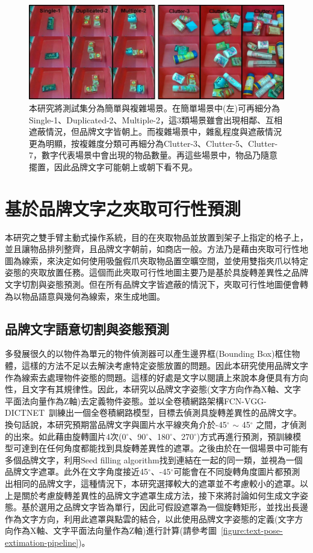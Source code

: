 \begin{figure}[htb]
	\centering
	\includegraphics[height=!, width=1.0\linewidth, keepaspectratio=true]
	{./figures/testset.jpg}
  \caption{本研究將測試集分為簡單與複雜場景。在簡單場景中(左)可再細分為Single-1、Duplicated-2、Multiple-2，這3類場景雖會出現相鄰、互相遮蔽情況，但品牌文字皆朝上。而複雜場景中，雜亂程度與遮蔽情況更為明顯，按複雜度分類可再細分為Clutter-3、Clutter-5、Clutter-7，數字代表場景中會出現的物品數量。再這些場景中，物品乃隨意擺置，因此品牌文字可能朝上或朝下看不見。}
  \label{figure:testset}
\end{figure}


\section{基於品牌文字之夾取可行性預測}
本研究之雙手臂主動式操作系統，目的在夾取物品並放置到架子上指定的格子上，並且讓物品排列整齊，且品牌文字朝前，如商店一般。方法乃是藉由夾取可行性地圖為線索，來決定如何使用吸盤假爪夾取物品置空曠空間，並使用雙指夾爪以特定姿態的夾取放置任務。這個而此夾取可行性地圖主要乃是基於具旋轉差異性之品牌文字切割與姿態預測。但在所有品牌文字皆遮蔽的情況下，夾取可行性地圖便會轉為以物品語意與幾何為線索，來生成地圖。

\subsection{品牌文字語意切割與姿態預測}
多發展很久的以物件為單元的物件偵測器可以產生邊界框(Bounding Box)框住物體，這樣的方法不足以去解決考慮特定姿態放置的問題。因此本研究使用品牌文字作為線索去處理物件姿態的問題。這樣的好處是文字以閱讀上來說本身便具有方向性，且文字有其規律性。因此，本研究以品牌文字姿態(文字方向作為X軸、文字平面法向量作為Z軸)去定義物件姿態。並以全卷積網路架構FCN-VGG-DICTNET~\cite{peterthesis}訓練出一個全卷積網路模型，目標去偵測具旋轉差異性的品牌文字。換句話說，本研究預期當品牌文字與圖片水平線夾角介於-45$^{\circ}$ $\sim$ 45$^{\circ}$ 之間，才偵測的出來。如此藉由旋轉圖片4次(0$^{\circ}$、90$^{\circ}$、180$^{\circ}$、270$^{\circ}$)方式再進行預測，預訓練模型可達到在任何角度都能找到具旋轉差異性的遮罩。之後由於在一個場景中可能有多個品牌文字，利用Seed filling algorithm找到連結在一起的同一類，並視為一個品牌文字遮罩。此外在文字角度接近45$^{\circ}$、-45$^{\circ}$可能會在不同旋轉角度圖片都預測出相同的品牌文字，這種情況下，本研究選擇較大的遮罩並不考慮較小的遮罩。以上是關於考慮旋轉差異性的品牌文字遮罩生成方法，接下來將討論如何生成文字姿態。基於選用之品牌文字皆為單行，因此可假設遮罩為一個旋轉矩形，並找出長邊作為文字方向，利用此遮罩與點雲的結合，以此使用品牌文字姿態的定義(文字方向作為X軸、文字平面法向量作為Z軸)進行計算(請參考圖~\ref{figure:text-pose-extimation-pipeline})。

